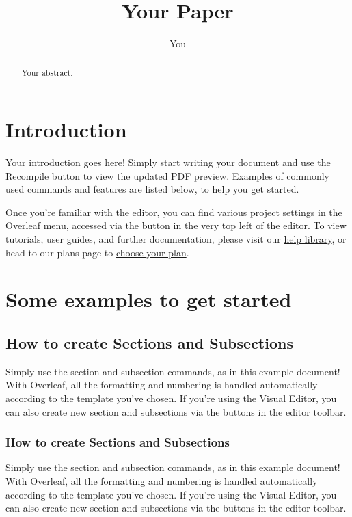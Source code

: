 \documentclass{article}
\title{Your Paper}
\author{You}
\begin{document}
	\maketitle
	
	\begin{abstract}
		Your abstract.
	\end{abstract}
	
	\section{Introduction}
	
	Your introduction goes here! Simply start writing your document and use the Recompile button to view the updated PDF preview. Examples of commonly used commands and features are listed below, to help you get started.
	
	Once you're familiar with the editor, you can find various project settings in the Overleaf menu, accessed via the button in the very top left of the editor. To view tutorials, user guides, and further documentation, please visit our \href{https://www.overleaf.com/learn}{help library}, or head to our plans page to \href{https://www.overleaf.com/user/subscription/plans}{choose your plan}.
	
	\section{Some examples to get started}
	
	\subsection{How to create Sections and Subsections}
	
	Simply use the section and subsection commands, as in this example document! With Overleaf, all the formatting and numbering is handled automatically according to the template you've chosen. If you're using the Visual Editor, you can also create new section and subsections via the buttons in the editor toolbar.
	
	\subsubsection{How to create Sections and Subsections}
	
	Simply use the section and subsection commands, as in this example document! With Overleaf, all the formatting and numbering is handled automatically according to the template you've chosen. If you're using the Visual Editor, you can also create new section and subsections via the buttons in the editor toolbar.
	
\end{document}
